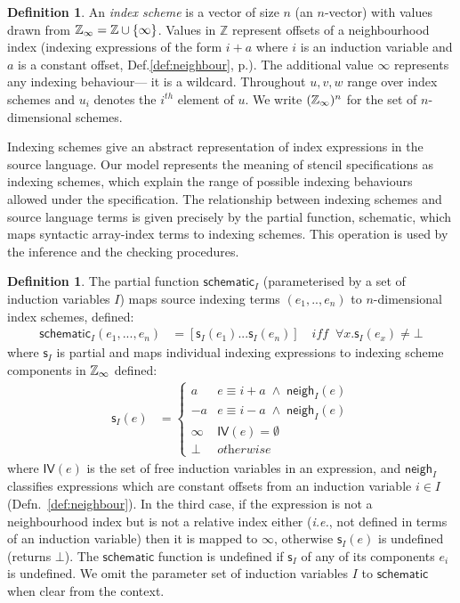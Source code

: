 \documentclass[9pt,preprint]{sigplanconf}
\newcounter{block}
\theoremstyle{definition}
\newtheorem{definition}[block]{Definition}
\newcommand{\ie}{\emph{i.e.}}
\newcommand{\neigh}{\textsf{neigh}}
\begin{document}
\begin{definition}
An \emph{index scheme} is a vector of size $n$ (an $n$-vector)
with values drawn from $\mathbb{Z}_\infty = \mathbb{Z} \cup \{\infty\}$.
Values in $\mathbb{Z}$ represent offsets
of a neighbourhood index (indexing
expressions of the form $i + a$ where $i$ is an induction variable
and $a$ is a constant offset, Def.\ref{def:neighbour},
p.\pageref{def:neighbour}). The additional value
$\infty$ represents any indexing behaviour--- it is a
wildcard.
Throughout $u, v, w$ range over index schemes and $u_i$ denotes
the $i^{th}$ element of $u$. We write $(\mathbb{Z}_\infty)^n$ for
the set of $n$-dimensional schemes.

Indexing schemes give an abstract
representation of index expressions in the source language.
Our model represents the meaning of stencil specifications
as indexing schemes, which explain the range of possible
indexing behaviours allowed under the specification.
The relationship between indexing schemes and source language
terms is given precisely by the partial function, \textsf{schematic}, which
maps syntactic array-index terms to indexing schemes. This
operation is used by the inference
and the checking procedures.
\end{definition}
%
\begin{definition}%
\label{def:schematic}
The partial function $\textsf{schematic}_I$ (parameterised by a set of
induction variables $I$) maps source indexing terms $(e_1, .., e_n)$
to $n$-dimensional index schemes, defined:
%
\begin{align*}
\mathsf{schematic}_I(e_1, ..., e_n) & =
[\mathsf{s}_I(e_1) ... \mathsf{s}_I(e_n) ]
\quad \textit{iff} \;\; \forall x . \mathsf{s}_I(e_x) \neq \bot
\end{align*}
%
where $\mathsf{s}_I$ is partial and 
maps individual indexing expressions to 
 indexing scheme components in $\mathbb{Z}_\infty{}$ defined:
\begin{align*}
\mathsf{s}_I(e)
 & =  \begin{cases}
a & e \equiv i + a \; \wedge \; \neigh_I(e) \\
-a & e \equiv i - a \; \wedge \; \neigh_I(e) \\
\infty & \textit{$\mathsf{IV}(e) = \emptyset$} \\
\bot   & \textit{otherwise}
\end{cases}
\end{align*}
where $\mathsf{IV}(e)$ is the set of free induction variables
in an expression, and $\neigh_I$ classifies expressions which
are constant offsets from an induction variable $i \in I$
(Defn.~\ref{def:neighbour}). In the third case,
if the expression is not a neighbourhood index but is not
a relative index either (\ie{}, not defined in terms
of an induction variable) then it is mapped to $\infty$, otherwise
$\mathsf{s}_I(e)$ is undefined (returns $\bot$). The $\mathsf{schematic}$ function
is undefined if $\mathsf{s}_I$ of any of its components $e_i$ is
undefined. We omit the parameter set of induction variables $I$ to
$\mathsf{schematic}$ when clear from the context. 
\end{definition}
\end{document}
